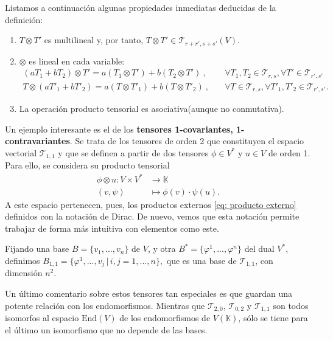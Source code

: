 \documentclass[11pt,a4paper,twoside,pdf]{article}
\numberwithin{equation}{section}
\begin{document}
	\noindent Listamos a continuación algunas propiedades inmediatas deducidas de la definición:
	\begin{enumerate}[leftmargin=0.6cm,itemsep=0.8pt]
		\item $T\otimes T'$ es multilineal y, por tanto, $T\otimes T' \in \mathcal{T}_{r+r',s+s'}(V)$.
		\item $\otimes$ es lineal en cada variable: \\
			\begin{equation*} \begin{aligned}
				(aT_1+bT_2) \otimes T' = a(T_1 \otimes T')+ b (T_2 \otimes T') \: , \quad	&\forall T_1,T_2 \in \mathcal{T}_{r,s}, \forall T' \in \mathcal{T}_{r',s'}\\ 
				T \otimes (aT'_1+bT'_2) = a(T\otimes T'_1) + b (T\otimes T'_2) \: , \quad	&\forall T \in \mathcal{T}_{r,s}, \forall T'_1, T'_2 \in \mathcal{T}_{r',s'}.
			\end{aligned} \end{equation*}
		\item La operación producto tensorial es asociativa(aunque no conmutativa).	
	\end{enumerate}
		
	Un ejemplo interesante es el de los \textbf{tensores 1-covariantes, 1-contravariantes}.	Se trata de los tensores de orden 2 que constituyen el espacio vectorial $\mathcal{T}_{1,1}$ y que se definen a partir de dos tensores $\phi\in V^*$ y $u\in V$ de orden 1. Para ello, se considera su producto tensorial
		\begin{equation}
			\begin{aligned}
				\phi\otimes u : V\times V^* & \rightarrow \mathbb{K}\\
				(v, \psi) & \mapsto \phi(v)\cdot \psi (u).
			\end{aligned}
		\end{equation}
	A este espacio pertenecen, pues, los productos externos \eqref{eq: producto externo}	definidos con la notación de Dirac. De nuevo, vemos que esta notación permite trabajar de forma más intuitiva con elementos como este.
	
	Fijando una base $B=\{v_1,...,v_n\}$ de $V$, y otra $B^*=\{\varphi^1,...,\varphi^n\}$ del dual $V^*$, definimos \(B_{1,1}=\{\varphi^1,...,v_j \, | \, i,j = 1,...,n \},\)
	que es una base de $\mathcal{T}_{1,1}$, con dimensión $n^2$.
	
	Un último comentario sobre estos tensores tan especiales es que guardan una potente relación con los endomorfismos. Mientras que $\mathcal{T}_{2,0}$, $\mathcal{T}_{0,2}$ y $\mathcal{T}_{1,1}$ son todos isomorfos al espacio $\text{End}(V)$ de los endomorfismos de $V(\mathbb{K})$, sólo se tiene para el último un isomorfismo que no depende de las bases. 
	
\end{document}
